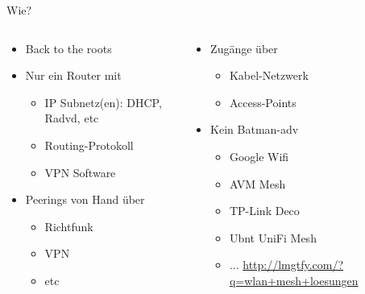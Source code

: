 \begin{frame}{Wie?}
    \begin{columns}[T]
        \begin{column}{0.46\textwidth}
            \begin{itemize}
                \item Back to the roots
                \item Nur ein Router mit
                \begin{itemize}
                    \item IP Subnetz(en): DHCP, Radvd, etc
                    \item Routing-Protokoll
                    \item VPN Software
                \end{itemize}
                \item Peerings von Hand über
                \begin{itemize}
                    \item Richtfunk
                    \item VPN
                    \item etc
                \end{itemize}
            \end{itemize}
        \end{column}
        \begin{column}{0.46\textwidth}
            \begin{itemize}
                \item Zugänge über
                \begin{itemize}
                    \item Kabel-Netzwerk
                    \item Access-Points
                \end{itemize}
                \item Kein Batman-adv
                \begin{itemize}
                    \item Google Wifi
                    \item AVM Mesh
                    \item TP-Link Deco
                    \item Ubnt UniFi Mesh
                    \item ... \url{http://lmgtfy.com/?q=wlan+mesh+loesungen}
                \end{itemize}
            \end{itemize}
        \end{column}
    \end{columns}
\end{frame}
